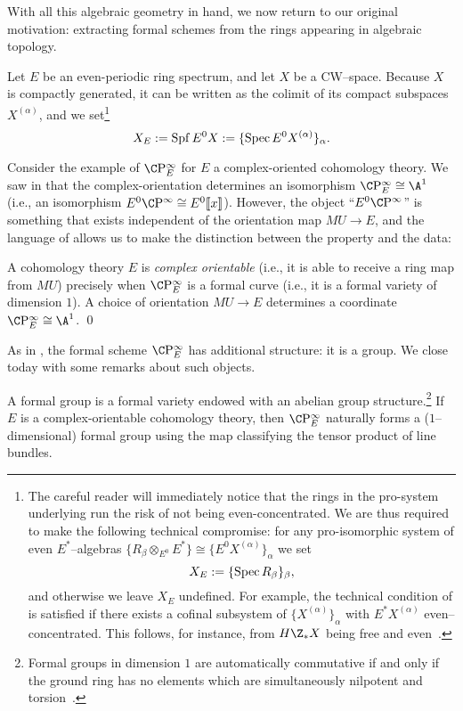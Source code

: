 With all this algebraic geometry in hand, we now return to our original motivation: extracting formal schemes from the rings appearing in algebraic topology.

\begin{definition}\label{FullDefnOfXE}
Let $E$ be an even-periodic ring spectrum, and let $X$ be a CW--space.  Because $X$ is compactly generated, it can be written as the colimit of its compact subspaces $X^{(\alpha)}$, and we set\footnote{The careful reader will immediately notice that the rings in the pro-system underlying  run the risk of not being even-concentrated.  We are thus required to make the following technical compromise: for any pro-isomorphic system of even $E^*$--algebras $\{R_\beta \otimes_{E^0} E^*\} \cong \{E^0 X^{(\alpha)}\}_\alpha$ we set \[X_E := \{\operatorname{Spec} R_\beta\}_\beta,\] and otherwise we leave $X_E$ undefined.  For example, the technical condition of  is satisfied if there exists a cofinal subsystem of $\{X^{(\alpha)}\}_\alpha$ with $E^* X^{(\alpha)}$ even--concentrated.  This follows, for instance, from $H\Z_* X$ being free and even~\cite[Definition 8.15, Proposition 8.17]{StricklandFSFG}.} \[X_E := \operatorname{Spf} E^0 X := \{\operatorname{Spec} E^0 X^{(\alpha)}\}_\alpha.\]
\end{definition}

Consider the example of $\CP^\infty_E$ for $E$ a complex-oriented cohomology theory.  We saw in  that the complex-orientation determines an isomorphism $\CP^\infty_E \cong \A^1$ (i.e., an isomorphism $E^0 \CP^\infty \cong E^0\ps{x}$).  However, the object ``$E^0 \CP^\infty$'' is something that exists independent of the orientation map $MU \to E$, and the language of  allows us to make the distinction between the property and the data:
\begin{lemma}
A cohomology theory $E$ is \textit{complex orientable} (i.e., it is able to receive a ring map from $MU$) precisely when $\CP^\infty_E$ is a formal curve (i.e., it is a formal variety of dimension $1$).  A choice of orientation $MU \to E$ determines a coordinate $\CP^\infty_E \cong \A^1$. \qed
\end{lemma}

As in , the formal scheme $\CP^\infty_E$ has additional structure: it is a group.  We close today with some remarks about such objects.

\begin{definition}\label{DefnFormalGps}
A formal group is a formal variety endowed with an abelian group structure.\footnote{Formal groups in dimension $1$ are automatically commutative if and only if the ground ring has no elements which are simultaneously nilpotent and torsion~\cite[Theorem I.6.1]{Hazewinkel}.}  If $E$ is a complex-orientable cohomology theory, then $\CP^\infty_E$ naturally forms a ($1$--dimensional) formal group using the map classifying the tensor product of line bundles.
\end{definition}

